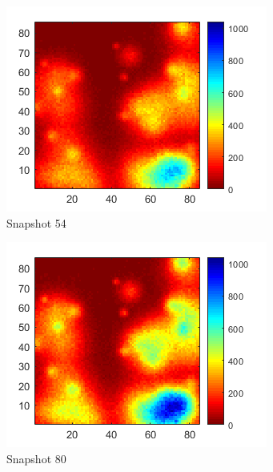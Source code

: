\documentclass[letterpaper,12pt,peerreviewca,draftcls]{IEEEtran}
\begin{document}
\begin{figure}[h]
\begin{subfigure}[t]{0.23\textwidth}
		\includegraphics[width=\linewidth]{"Figure 15c"}
		\caption{Snapshot 54}
	\end{subfigure}
	\begin{subfigure}[t]{0.23\textwidth}
		\includegraphics[width=\linewidth]{"Figure 15d"}
		\caption{Snapshot 80}
	\end{subfigure}
	\begin{subfigure}[t]{0.23\textwidth}

\end{subfigure}
\end{figure}
\end{document}
